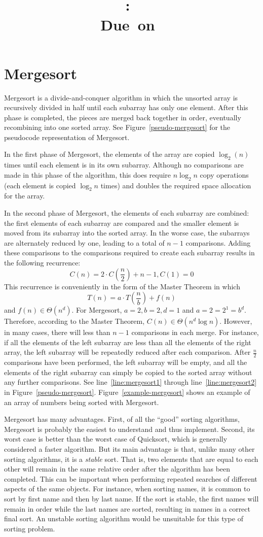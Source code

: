\documentclass{article}
\title{
    \vspace{2in}
    \textmd{\textbf{\hmwkClass:\ \hmwkTitle}}\\
    \normalsize\vspace{0.1in}\small{Due\ on\ \hmwkDueDate}\\
    \vspace{0.1in}\large{\textit{\hmwkClassInstructor}}
    \vspace{3in}
}
\author{\textbf{\hmwkAuthorName}}
\begin{document}
\section{Mergesort}
Mergesort is a divide-and-conquer algorithm in which the unsorted array is recursively divided
in half until each subarray has only one element. After this phase is completed, the pieces are 
merged back together in order, eventually recombining into one sorted array. See 
Figure~\ref{pseudo-mergesort} for the pseudocode representation of Mergesort.

In the first phase of Mergesort, the elements of the array are copied $\log_2(n)$ times until each 
element is in its own subarray. Although no comparisons are made in this phase of the algorithm,
this does require $n\log_2 n$ copy operations (each element is copied $\log_2n$ times) 
and doubles the required space allocation for the array.

In the second phase of Mergesort, the elements of each subarray are combined: the first elements of each subarray are compared and the smaller element is moved from its subarray into the sorted array. In the worse case, the subarrays are alternately reduced by one, leading to a total of $n-1$
comparisons. Adding these comparisons to the comparisons required to create each subarray 
results in the following recurrence:
\[
	C(n) = 2 \cdot C\left(\frac{n}{2}\right) + n-1, C(1) = 0
\]
This recurrence is conveniently in the form of the Master Theorem in which
\[
	T(n) = a \cdot T\left(\frac{n}{b}\right) +f(n)
\]
and $f(n) \in \Theta(n^d)$. For Mergesort, $a = 2, b = 2, d = 1$ and $a = 2 = 2^1 = b^d$. 
Therefore, according to the Master Theorem, $C(n) \in \Theta(n^d \log n)$. However, in many
cases, there will less than $n-1$ comparisons in each merge. For instance, if
all the elements of the left subarray are less than all the elements of the right array, the left
subarray will be repeatedly reduced after each comparison. After $\frac{n}{2}$ comparisons 
have been performed, the left subarray will be empty, and all the elements of the right subarray 
can simply be copied to the sorted array without any further comparisons. 
See line~\ref{line:mergesort1} through line~\ref{line:mergesort2} in Figure~\ref{pseudo-mergesort}.
Figure~\ref{example-mergesort} shows an example of an array of numbers being sorted with Mergesort.

Mergesort has many advantages. First, of all the ``good'' sorting algorithms, Mergesort is probably
the easiest to understand and thus implement. Second, its worst case is better than the worst
case of Quicksort, which is generally considered a faster algorithm. But its main advantage is that,
unlike many other sorting algorithms, it is a \textit{stable} sort. That is, two elements that are equal 
to each other will remain in the same relative order after the algorithm has been completed. This
can be important when performing repeated searches of different aspects of the same objects.
For instance, when sorting names, it is common to sort by first name and then by last name.
If the sort is stable, the first names will remain in order while the last names are sorted, resulting
in names in a correct final sort. An unstable sorting algorithm would be unsuitable for this
type of sorting problem.
\end{document}
